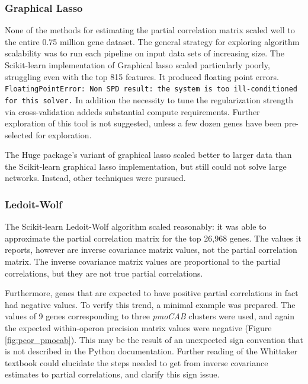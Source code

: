 \subsubsection{Graphical Lasso}
None of the methods for estimating the partial correlation matrix scaled well to the entire 0.75 million gene dataset.
The general strategy for exploring algorithm scalability was to run each pipeline on input data sets of increasing size.
The Scikit-learn implementation of Graphical lasso scaled particularly poorly, struggling even with the top 815 features.
It produced floating point errors. %
\texttt{FloatingPointError: Non SPD result: the system is too ill-conditioned for this solver.} %
In addition the necessity to tune the regularization strength via cross-validation addeds substantial compute requirements.
Further exploration of this tool is not suggested, unless a few dozen genes have been pre-selected for exploration.

The Huge package's variant of graphical lasso scaled better to larger data than the Scikit-learn graphical lasso implementation, but still could not solve large networks.
Instead, other techniques were pursued. 

\subsubsection{Ledoit-Wolf}
The Scikit-learn Ledoit-Wolf algorithm scaled reasonably: it was able to approximate the partial correlation matrix for the top 26,968 genes.
The values it reports, however are inverse covariance matrix values, not the partial correlation matrix.
The inverse covariance matrix values are proportional to the partial correlations, but they are not true partial correlations.

Furthermore, genes that are expected to have positive partial correlations in fact had negative values.
To verify this trend, a minimal example was prepared.
The values of 9 genes corresponding to three \textit{pmoCAB} clusters were used, and again the expected within-operon precision matrix values were negative (Figure \ref{fig:pcor_pmocab}).
This may be the result of an unexpected sign convention that is not described in the Python documentation.
Further reading of the Whittaker textbook \cite{whittaker2009} could elucidate the steps needed to get from inverse covariance estimates to partial correlations, and clarify this sign issue.


